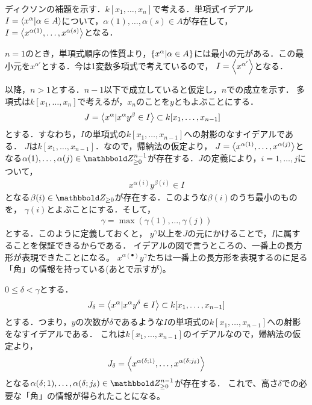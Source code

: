 \documentclass[9pt]{ltjsarticle}
\begin{document}
ディクソンの補題を示す．$k[x_1,\dots,x_n]$で考える．単項式イデアル$I=\left\langle x^{\alpha}|\alpha \in A \right\rangle$について，$\alpha(1),\dots,\alpha(s)\in A$が存在して，$I=\left\langle x^{\alpha(1)},\dots,x^{\alpha(s)} \right\rangle$となる．
\begin{myproof}
$n=1$のとき，単項式順序の性質より，$\left\{x^\alpha | \alpha \in A\right\}$には最小の元がある．この最小元を$x^{\alpha'}$とする．今は1変数多項式で考えているので，
$I=\left\langle x^{\alpha'} \right\rangle$となる．

以降，$n>1$とする．$n-1$以下で成立していると仮定し，$n$での成立を示す．
多項式は$k[x_1,\dots,x_n]$で考えるが，$x_n$のことを$y$ともよぶことにする．
\begin{align}
 J &= \left\langle x^\alpha | x^\alpha y^\beta \in I \right\rangle \subset k[x_1,\dots,x_{n-1}]
\end{align}
とする．すなわち，$I$の単項式の$k[x_1,\dots,x_{n-1}]$への射影のなすイデアルである．
$J$は$k[x_1,\dots,x_{n-1}]$．なので，帰納法の仮定より，
$J=\left\langle x^{\alpha(1)},\dots,x^{\alpha(j)} \right\rangle$となる$\alpha(1),\dots,\alpha(j) \in \Zge^{n-1}$が存在する．$J$の定義により，$i=1,\dots,j$について，
\begin{align}
 x^{\alpha(i)}y^{\beta(i)} \in I
\end{align}
となる$\beta(i)\in \Zge$が存在する．このような$\beta(i)$のうち最小のものを，
$\gamma(i)$とよぶことにする．そして，
\begin{align}
 \gamma = \max(\gamma(1),\dots,\gamma(j))
\end{align}
とする．このように定義しておくと，
$y^\gamma$以上を$J$の元にかけることで，$I$に属することを保証できるからである．
イデアルの図で言うところの、一番上の長方形が表現できたことになる。
$x^{\alpha(\bullet)}y^\gamma$たちは一番上の長方形を表現するのに足る「角」の情報を持っている(あとで示すが)。

$0\le \delta < \gamma$とする．
\begin{align}
 J_{\delta} = \left\langle x^\alpha | x^\alpha y^\delta \in I \right\rangle \subset k[x_1,\dots,x_{n-1}]
\end{align}
とする．つまり，$y$の次数が$\delta$であるような$I$の単項式の$k[x_1,\dots,x_{n-1}]$への射影をなすイデアルである．
これは$k[x_1,\dots,x_{n-1}]$のイデアルなので，帰納法の仮定より，
\begin{align}
 J_\delta = \left\langle x^{\alpha(\delta;1)},\dots,x^{\alpha(\delta;j_\delta)} \right\rangle
\end{align}
となる$\alpha(\delta;1),\dots,\alpha(\delta;j_\delta) \in \Zge^{n-1}$が存在する．
これで、高さ$\delta$での必要な「角」の情報が得られたことになる。


\end{myproof}
\end{document}
